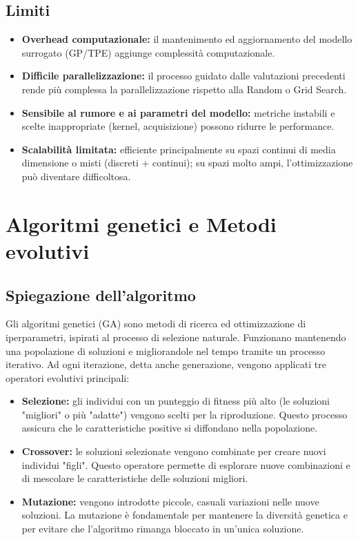 \documentclass[a4paper,12pt]{report}
\begin{document}
	\subsection{Limiti}
	\begin{itemize}
		\item \textbf{Overhead computazionale:} il mantenimento ed aggiornamento del modello surrogato (GP/TPE) aggiunge complessità computazionale.
		\item \textbf{Difficile parallelizzazione:} il processo guidato dalle valutazioni precedenti rende più complessa la parallelizzazione rispetto alla Random o Grid Search.
		\item \textbf{Sensibile al rumore e ai parametri del modello:} metriche instabili e scelte inappropriate (kernel, acquisizione) possono ridurre le performance.
		\item \textbf{Scalabilità limitata:} efficiente principalmente su spazi continui di media dimensione o misti (discreti + continui); su spazi molto ampi, l'ottimizzazione può diventare difficoltosa.
	\end{itemize}
	
	\section{Algoritmi genetici e Metodi evolutivi}
	\subsection{Spiegazione dell'algoritmo}
	Gli algoritmi genetici (GA) sono metodi di ricerca ed ottimizzazione di iperparametri, ispirati al processo di selezione naturale. Funzionano mantenendo una popolazione di soluzioni e migliorandole nel tempo tramite un processo iterativo. Ad ogni iterazione, detta anche generazione, vengono applicati tre operatori evolutivi principali:
	
	\begin{itemize}
		\item \textbf{Selezione:} gli individui con un punteggio di fitness più alto (le soluzioni "migliori" o più "adatte") vengono scelti per la riproduzione. Questo processo assicura che le caratteristiche positive si diffondano nella popolazione.
		\item \textbf{Crossover:} le soluzioni selezionate vengono combinate per creare nuovi individui "figli". Questo operatore permette di esplorare nuove combinazioni e di mescolare le caratteristiche delle soluzioni migliori.
		\item \textbf{Mutazione:} vengono introdotte piccole, casuali variazioni nelle nuove soluzioni. La mutazione è fondamentale per mantenere la diversità genetica e per evitare che l'algoritmo rimanga bloccato in un'unica soluzione.
	\end{itemize}
	
\end{document}
